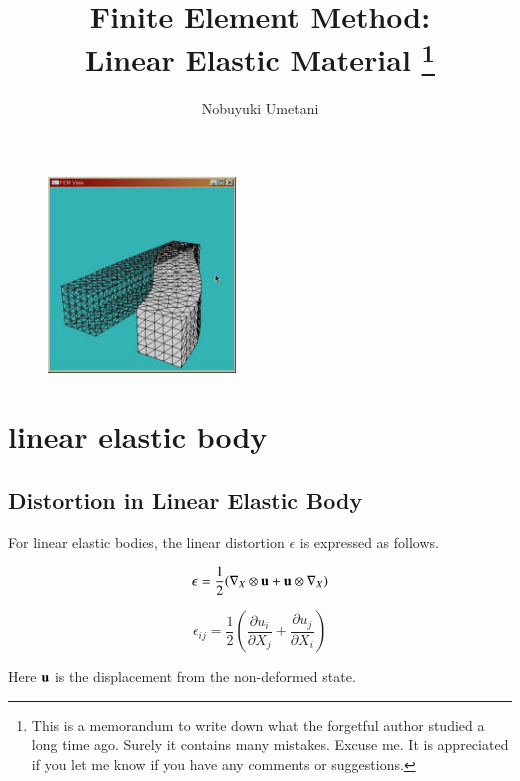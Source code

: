 



\title{Finite Element Method:\\ Linear Elastic Material \footnote{This is a memorandum to write down what the forgetful author studied a long time ago. Surely it contains many mistakes. Excuse me. It is appreciated if you let me know if you have any comments or suggestions. }}
\author{Nobuyuki Umetani}



\maketitle
\tableofcontents

\begin{figure}[hpbt]
\includegraphics[width=5cm]{images/linear_solid3d.eps}
\end{figure}


\section{linear elastic body}

\subsection{Distortion in Linear Elastic Body}


For linear elastic bodies, the linear distortion $\epsilon$ is expressed as follows.

\begin{equation}
\mathbf{\epsilon}=\frac{1}{2}(\nabla_X\otimes\mathbf{u}+\mathbf{u}\otimes\nabla_X)
\end{equation}

\begin{equation}
\epsilon_{ij}=\frac{1}{2}(\frac{\partial u_i}{\partial X_j}+\frac{\partial u_j}{\partial X_i})
\end{equation}


Here $\mathbf{u}$ is the displacement from the non-deformed state.


